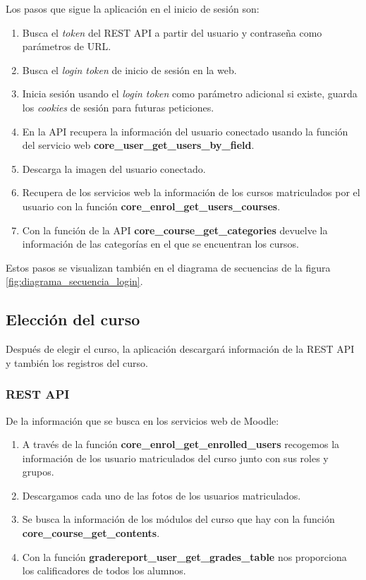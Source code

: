 Los pasos que sigue la aplicación en el inicio de sesión son:
\begin{enumerate}
	\item Busca el \textit{token} del REST API a partir del usuario y contraseña como parámetros de URL.
	\item Busca el \textit{login token} de inicio de sesión en la web.
	\item Inicia sesión usando el \textit{login token} como parámetro adicional si existe, guarda los \textit{cookies} de sesión para futuras peticiones. 
	\item En la API recupera la información del usuario conectado usando la función del servicio web \textbf{core\_user\_get\_users\_by\_field}.
	\item Descarga la imagen del usuario conectado.
	\item Recupera de los servicios web la información de los cursos matriculados por el usuario con la función \textbf{core\_enrol\_get\_users\_courses}.
	\item Con la función de la API \textbf{core\_course\_get\_categories} devuelve la información de las categorías en el que se encuentran los cursos.
\end{enumerate}
Estos pasos se visualizan también en el diagrama de secuencias de la figura \ref{fig:diagrama_secuencia_login}.




\subsection{Elección del curso}

Después de elegir el curso, la aplicación descargará información de la REST API y también los registros del curso. 

\subsubsection{REST API}

De la información que se busca en los servicios web de Moodle:


\begin{enumerate}
	\item A través de la función \textbf{core\_enrol\_get\_enrolled\_users} recogemos la información de los usuario matriculados del curso junto con sus roles y grupos.
	\item Descargamos cada uno de las fotos de los usuarios matriculados.
	\item Se busca la información de los módulos del curso que hay con la función
	\textbf{core\_course\_get\_contents}.
	\item Con la función \textbf{gradereport\_user\_get\_grades\_table} nos proporciona los calificadores de todos los alumnos.
	
\end{enumerate}

